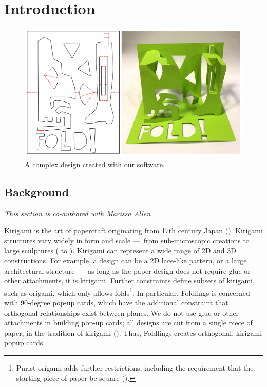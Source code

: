 \chapter{Introduction}

\begin{figure}[htbp]
\centering
\includegraphics{figures/shared/01_Background/complexFoldlings.pdf}
\caption{A complex design created with our software.}
\end{figure}

\section{Background}\label{background}

\emph{This section is co-authored with Marissa Allen}

Kirigami is the art of papercraft originating from 17th century Japan
(\citet{temko1978magic}). Kirigami structures vary widely in form and
scale ---~from sub-microscopic creations to large sculptures
(\citet{grosso2015bending} to \citet{andrewscreating}). Kirigami can
represent a wide range of 2D and 3D constructions. For example, a design
can be a 2D lace-like pattern, or a large architectural structure ---~as
long as the paper design does not require glue or other attachments, it
is kirigami. Further constraints define subsets of kirigami, such as
origami, which only allows folds\footnote{Purist origami adds further
  restrictions, including the requirement that the starting piece of
  paper be square (\citet{burczykul}).}. In particular, Foldlings is
concerned with 90-degree pop-up cards, which have the additional
constraint that orthogonal relationships exist between planes. We do not
use glue or other attachments in building pop-up cards; all designs are
cut from a single piece of paper, in the tradition of kirigami
(\citet{temko1978magic}). Thus, Foldlings creates orthogonal, kirigami
popup cards.

